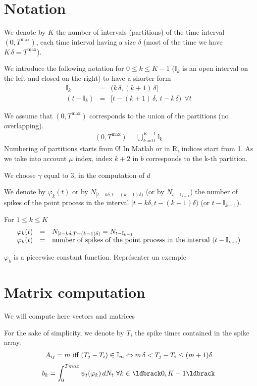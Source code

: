 \documentclass[]{article}
\newcommand{\be}{\begin{eqnarray*}}
\newcommand{\ee}{\end{eqnarray*}}
\def\Ik{\mathbb{I}_k}
\def\Ikm{\mathbb{I}_{\scriptscriptstyle{k-1}}}
\def\Im{\mathbb{I}_m}
\def\Tmax{T^{\max}}
\begin{document}
\shorthandoff{:}
\tableofcontents
\listofalgorithms

\section{Notation}
We denote by $K$ the number of intervals (partitions) of the time interval $(0,\Tmax)$, each time interval having a size $\delta$ (most of the time we have $K\,\delta=\Tmax$).

We introduce the following notation for $0\leq k \leq K-1$ ($\Ik$ is an open interval on the left and closed on the right) to have a shorter form
\be
\Ik&=&(k\,\delta,(k+1)\,\delta]\\
(t-\Ik)&=&[t-(k+1)\,\delta,\,t-k\,\delta) \ \ \forall t
\ee

We assume that $(0,\Tmax)$ corresponds to the union of the partitions (no overlapping).
\be
(0,\Tmax)=\bigcup_{k=0}^{K-1} \Ik
\ee
Numbering of partitions starts from 0!
In Matlab or in R, indices start from 1.
As we take into account $\mu$ index, index $k+2$ in $b$ corresponds to the k-th partition.

We choose $\gamma$ equal to 3, in the computation of $d$

We denote by $\varphi_k(t)$ or by $N_{[t-k\delta,t-(k-1)\delta)}$ (or by $N_{t-\Ikm}$) the number of spikes of the point process in the interval $[t-k\delta,t-(k-1)\delta)$ (or $t-\Ikm$).

For $1\leq k \leq K$
\begin{eqnarray}
\begin{array}{lll}
\varphi_k(t)&=&N_{[t-k\delta,T-(k-1)\delta)}=N_{t-\Ikm}\\
\varphi_k(t)&=&\hbox{number of spikes of the point process in the interval }(t-\Ikm)
\end{array}
\end{eqnarray}

$\varphi_k$ is a piecewise constant function. Représenter un exemple
\section{Matrix computation}
We will compute here vectors and matrices 

For the sake of simplicity, we denote by $T_i$ the spike times contained in the spike array.
\be
A_{ij} = m \hbox{ iff } (T_j - T_i) \in \Im \Leftrightarrow m\,\delta < T_j-T_i \leq (m+1)\delta
\ee
\be
b_{k}=\int_0^{Tmax} \psi_t(\varphi_k)\,dN_t \ \forall k \in \ldbrack 0,K-1\ldbrack
\ee
\end{document}
